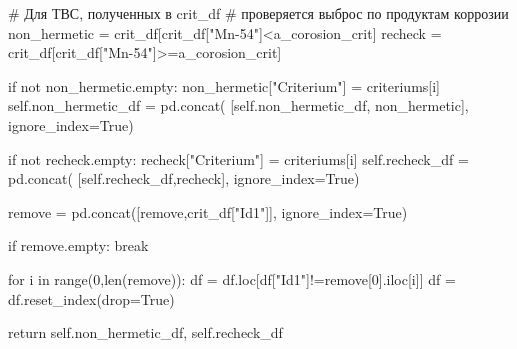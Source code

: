 \documentclass[a4paper,12pt]{article}
\begin{document}
\begin{appendices}
\begin{flushleft}
\begin{MyCodes}
			# Для ТВС, полученных в crit_df
			# проверяется выброс по продуктам коррозии
			non_hermetic = crit_df[crit_df["Mn-54"]<a_corosion_crit]
			recheck = crit_df[crit_df["Mn-54"]>=a_corosion_crit]
			
			if not non_hermetic.empty:
				non_hermetic["Criterium"] = criteriums[i] 
				self.non_hermetic_df = pd.concat(
					[self.non_hermetic_df,
						non_hermetic], ignore_index=True)
			
			if not recheck.empty:
				recheck["Criterium"] = criteriums[i] 
				self.recheck_df = pd.concat(
					[self.recheck_df,recheck], 
						ignore_index=True)
			
			remove = pd.concat([remove,crit_df["Id1"]], ignore_index=True)
		
		if remove.empty:
			break
		
		for i in range(0,len(remove)):
		df = df.loc[df["Id1"]!=remove[0].iloc[i]]
		df = df.reset_index(drop=True)
	
	return self.non_hermetic_df, self.recheck_df
\end{MyCodes}
\end{flushleft}

\pagebreak



\end{appendices}
\end{document}
